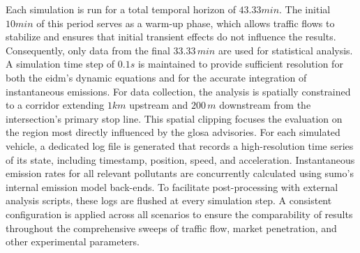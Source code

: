 Each simulation is run for a total temporal horizon of $43.33\unit{min}$. The initial $10\unit{min}$ of this period serves as a warm-up phase, which allows traffic flows to stabilize and ensures that initial transient effects do not influence the results. Consequently, only data from the final $33.33\,\unit{min}$ are used for statistical analysis. A simulation time step of $0.1\unit{s}$ is maintained to provide sufficient resolution for both the \ac{eidm}'s dynamic equations and for the accurate integration of instantaneous emissions. For data collection, the analysis is spatially constrained to a corridor extending $1\unit{km}$ upstream and $200\,\unit{m}$ downstream from the intersection's primary stop line. This spatial clipping focuses the evaluation on the region most directly influenced by the \ac{glosa} advisories.
\mynewline
For each simulated vehicle, a dedicated log file is generated that records a high-resolution time series of its state, including timestamp, position, speed, and acceleration. Instantaneous emission rates for all relevant pollutants are concurrently calculated using \ac{sumo}’s internal emission model back-ends. To facilitate post-processing with external analysis scripts, these logs are flushed at every simulation step. A consistent configuration is applied across all scenarios to ensure the comparability of results throughout the comprehensive sweeps of traffic flow, market penetration, and other experimental parameters.

